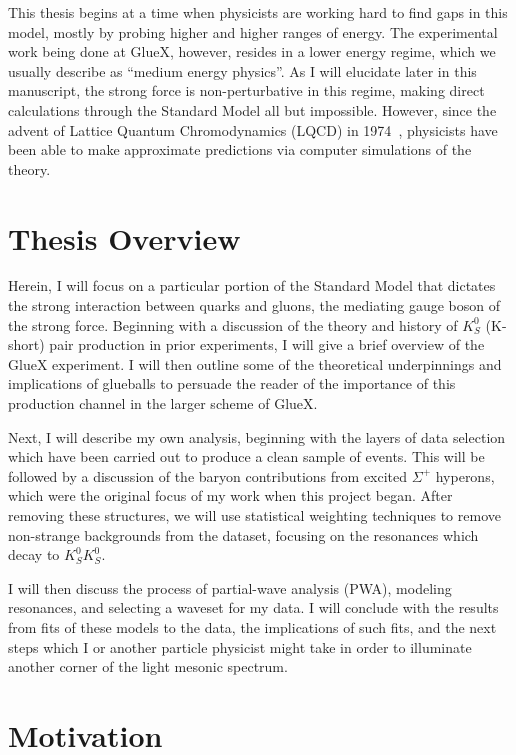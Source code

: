 This thesis begins at a time when physicists are working hard to find gaps in this model, mostly by probing higher and higher ranges of energy. The experimental work being done at GlueX, however, resides in a lower energy regime, which we usually describe as ``medium energy physics''. As I will elucidate later in this manuscript, the strong force is non-perturbative in this regime, making direct calculations through the Standard Model all but impossible. However, since the advent of Lattice Quantum Chromodynamics (LQCD) in 1974~\cite{Wilson1974}, physicists have been able to make approximate predictions via computer simulations of the theory.

\section{Thesis Overview}\label{sec:thesis_overview}

Herein, I will focus on a particular portion of the Standard Model that dictates the strong interaction between quarks and gluons, the mediating gauge boson of the strong force. Beginning with a discussion of the theory and history of $K_S^0$ (K-short) pair production in prior experiments, I will give a brief overview of the GlueX experiment. I will then outline some of the theoretical underpinnings and implications of glueballs to persuade the reader of the importance of this production channel in the larger scheme of GlueX.

Next, I will describe my own analysis, beginning with the layers of data selection which have been carried out to produce a clean sample of events. This will be followed by a discussion of the baryon contributions from excited $\Sigma^+$ hyperons, which were the original focus of my work when this project began. After removing these structures, we will use statistical weighting techniques to remove non-strange backgrounds from the dataset, focusing on the resonances which decay to $K_S^0K_S^0$.

I will then discuss the process of partial-wave analysis (PWA), modeling resonances, and selecting a waveset for my data. I will conclude with the results from fits of these models to the data, the implications of such fits, and the next steps which I or another particle physicist might take in order to illuminate another corner of the light mesonic spectrum.

\section{Motivation}\label{sec:motivation}

